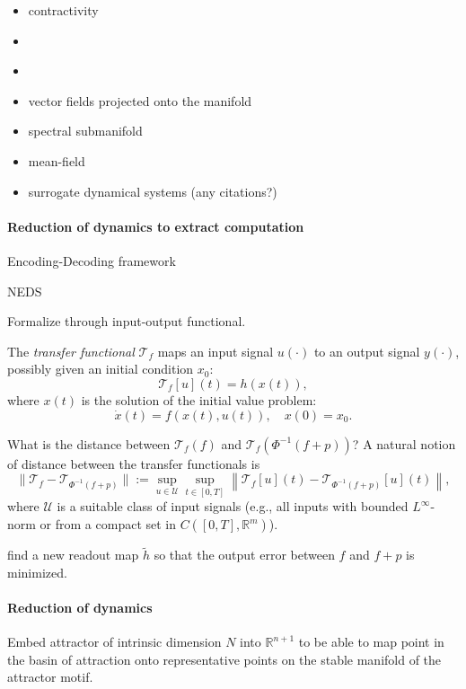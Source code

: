 \documentclass{article}
\theoremstyle{definition} \newtheorem{definition}{Definition}  \newtheorem{example}{Example}
\theoremstyle{remark} \newtheorem{remark}{Remark}
\newcommand{\reals}{\mathbb{R}}
\newcounter{ct}
\begin{document}
\begin{itemize}
\item contractivity \citep{lohmiller1998contraction}\citep{bullo2023contraction} \citep{revay2020contracting} \citep{tsukamoto2021contraction} \citep{davydov2022rnn, davydov2024noneuclidean}
\item \citep{li2021novel}
\item \citep{otto2023learning}
\item vector fields projected onto the manifold \citep{roy2021extracting, luo2023noncanonical}
\item spectral submanifold \citep{cenedese2022data, axaas2023fast, bettini2024model, kaszas2024data}
\item mean-field\citep{bick2020understanding}
\item surrogate dynamical systems (any citations?)
\end{itemize}



\paragraph{Reduction of dynamics to extract computation}
Encoding-Decoding framework

\citep{zhang2025neural} NEDS


Formalize through input-output functional.

The \emph{transfer functional} \( \mathcal{T}_f \) maps an input signal \( u(\cdot) \) to an output signal \( y(\cdot) \), possibly given an initial condition \( x_0 \):
\[
\mathcal{T}_f[u](t) = h(x(t)),
\]
where \( x(t) \) is the solution of the initial value problem:
\[
\dot{x}(t) = f(x(t), u(t)), \quad x(0) = x_0.
\]

What is the distance between $\mathcal{T}_f(f)$ and $\mathcal{T}_f(\Phi^{-1}(f+p))$?
A natural notion of distance between the transfer functionals is
\[
\|\mathcal{T}_f - \mathcal{T}_{\Phi^{-1}(f+p)}\| 
:= \sup_{u \in \mathcal{U}} \sup_{t \in [0, T]} 
\left\| \mathcal{T}_f[u](t) - \mathcal{T}_{\Phi^{-1}(f+p)}[u](t) \right\|,
\]
where \( \mathcal{U} \) is a suitable class of input signals (e.g., all inputs with bounded \( L^\infty \)-norm or from a compact set in \( C([0,T], \mathbb{R}^m) \)).

find a new readout map $\tilde h$  so that the output error between $f$ and $f+p$ is minimized.


\paragraph{Reduction of dynamics}
Embed attractor of intrinsic dimension $N$ into $\reals^{n+1}$ to be able to map point in the basin of attraction onto representative points on the stable manifold of the attractor motif.
\end{document}

